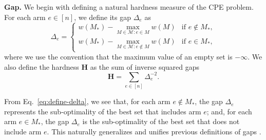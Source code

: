 \documentclass{article}
\newcommand{\Problem}{{CPE}\xspace}
\newcommand{\M}{\mathcal M}
\newcommand{\MultiIdent}{\textsc{TopK}\xspace}
\newcommand{\MultiBandit}{\textsc{MB}\xspace}
\begin{document}
\textbf{Gap.} We begin with defining a natural hardness measure of the \Problem problem. 
For each arm $e \in [n]$, we define its gap $\Delta_e$ as
\begin{equation}
\label{eq:define-delta}
\Delta_e = \begin{cases}
			   w(M_*)-\max_{M\in \M: e\in M} w(M) & \text{if } e\not \in M_*, \\
			   w(M_*)-\max_{M\in \M: e\not \in M} w(M) & \text{if } e\in M_*,
			\end{cases}
\end{equation}
where we use the convention that the maximum value of an empty set is $-\infty$. 
We also define the hardness $\mathbf H$ as the sum of inverse squared gaps 
\begin{equation}
\label{eq:hardness}
\mathbf H =\sum_{e\in [n]} \Delta_e^{-2}.
\end{equation}

From Eq.~\eqref{eq:define-delta}, we see that, for each arm $e\not\in M_*$, the gap $\Delta_e$ represents the sub-optimality of the best set that includes arm $e$; and, for each arm $e\in M_*$, the gap $\Delta_e$ is the sub-optimality of the best set that does not include arm $e$.
This naturally generalizes and unifies previous definitions of gaps \citep{audibert2010best,NIPS2011_4478,kalyanakrishnan2010efficient,bubeck2013multiple}.
\end{document}
